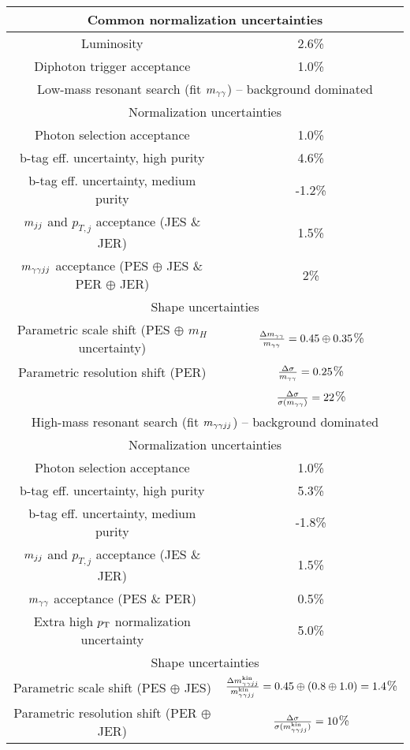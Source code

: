 \begin{tabular}{|c|c|}
\hline
\multicolumn{2}{|c|}{Common normalization uncertainties} \\
\hline
Luminosity & 2.6\%\\
Diphoton trigger acceptance & 1.0\% \\
\hline
\hline
\multicolumn{2}{|c|}{Low-mass resonant search (fit $m_{\gamma\gamma}$) -- background dominated} \\
\hline
\hline
\multicolumn{2}{|c|}{Normalization uncertainties} \\
\hline
Photon selection acceptance & 1.0\% \\ 
b-tag eff. uncertainty, high purity & 4.6\% \\  
b-tag eff. uncertainty, medium purity & -1.2\% \\  
$m_{jj}$ and $p_{T, j}$ acceptance (JES \& JER) & 1.5\%\\
$m_{\gamma\gamma jj}$ acceptance (PES $\oplus$ JES \& PER  $\oplus$ JER) & 2\%\\
\hline
\multicolumn{2}{|c|}{Shape uncertainties} \\
\hline
Parametric scale shift (PES $\oplus$ $m_H$ uncertainty)      & $\frac{\Delta m_{\gamma\gamma}}{m_{\gamma\gamma}} = 0.45 \oplus 0.35$\%\\
Parametric resolution shift (PER) & $\frac{\Delta\sigma}{m_{\gamma\gamma}} = 0.25$\% \\
                                  & $\frac{\Delta\sigma}{\sigma(m_{\gamma\gamma})} = 22$\% \\
\hline
\hline
\multicolumn{2}{|c|}{High-mass resonant search (fit $m_{\gamma\gamma jj}$) -- background dominated} \\
\hline
\hline
\multicolumn{2}{|c|}{Normalization uncertainties} \\
\hline
Photon selection acceptance & 1.0\% \\ 
b-tag eff. uncertainty, high purity & 5.3\% \\  
b-tag eff. uncertainty, medium purity & -1.8\% \\  
$m_{jj}$ and $p_{T, j}$ acceptance (JES \& JER) & 1.5\%\\
$m_{\gamma\gamma}$ acceptance (PES \& PER) & 0.5\% \\
Extra high $p_{\rm T}$ normalization uncertainty & 5.0\% \\
\hline
\multicolumn{2}{|c|}{Shape uncertainties} \\
\hline
Parametric scale shift (PES $\oplus$ JES) & $\frac{\Delta m_{\gamma\gamma jj}^{\rm kin}}{m_{\gamma\gamma jj}^{\rm kin}} = 0.45 \oplus (0.8 \oplus 1.0) = 1.4$\% \\
Parametric resolution shift (PER $\oplus$ JER) & $\frac{\Delta\sigma}{\sigma(m_{\gamma\gamma jj}^{\rm kin})} = 10$\% \\
\hline
\end{tabular}
